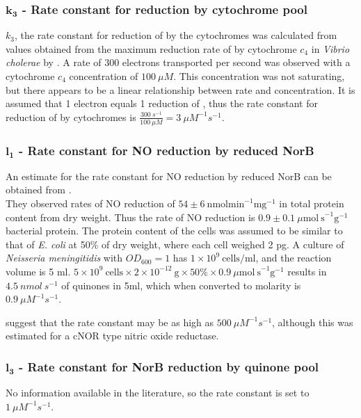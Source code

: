 \subsubsection*{$\mathbf{k_3}$ {\bf- Rate constant for \cbbthree{} reduction by cytochrome pool}}
$k_3$, the rate constant for reduction of \cbbthree{} by the cytochromes was calculated from values obtained from the maximum reduction rate of \cbbthree{} by cytochrome $c_4$ in \textit{Vibrio cholerae} by \citet{Chang2010}. A rate of 300 electrons transported per second was observed with a cytochrome $c_4$ concentration of $100~\mu M$. This concentration was not saturating, but there appears to be a linear relationship between rate and concentration. It is assumed that 1 electron equals 1 reduction of \cbbthree{}, thus the rate constant for reduction of \cbbthree{} by cytochromes is $\frac{300~s^{-1}}{100~\mu M} = 3~\mu M^{-1}s^{-1}$.

\subsubsection*{$\mathbf{l_1}$ {\bf- Rate constant for NO reduction by reduced NorB}}

An estimate for the rate constant for NO reduction by reduced NorB can be obtained from \citet{Rock2007}.\\
\noindent They observed rates of NO reduction of $54 \pm 6~\mathrm{nmolmin}^{-1} \mathrm{mg}^{-1}$  in total protein content from dry weight. Thus the rate of NO reduction is $0.9 \pm 0.1~\mu\mathrm{mol~s}^{-1}\mathrm{g}^{-1}$ bacterial protein. The protein content of the cells was assumed to be similar to that of \textit{E. coli} at 50\% of dry weight, where each cell weighed 2 pg. A culture of \textit{Neisseria meningitidis} with $OD_{600} = 1$ has $1 \times 10^9~\textrm{cells/ml}$, and the reaction volume is 5 ml. $5\times 10^9~\textrm{cells} \times 2\times 10^{-12}~\textrm{g} \times 50\% \times 0.9~\mu\mathrm{mol~ s}^{-1}\mathrm{g}^{-1}$ results in $4.5~nmol~s^{-1}$ of quinones in 5ml, which when converted to molarity is $0.9~\mu M^{-1} s^{-1}$.

\citet{Wasser2002} suggest that the rate constant may be as high as $500~\mu M^{-1} s^{-1}$, although this was estimated for a cNOR type nitric oxide reductase.

\subsubsection*{$\mathbf{l_3}$ {\bf- Rate constant for NorB reduction by quinone pool}}
No information available in the literature, so the rate constant is set to $1~\mu M^{-1}s^{-1}$.

